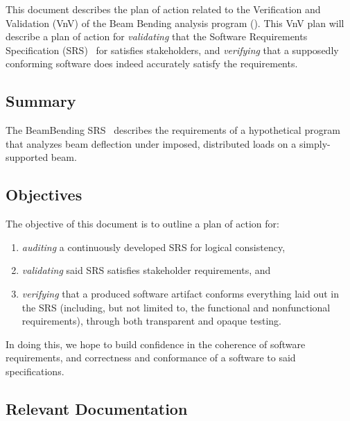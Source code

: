 \documentclass[12pt, titlepage]{article}
\begin{document}
This document describes the plan of action related to the Verification and
Validation (VnV) of the Beam Bending analysis program (\progname{}). This VnV
plan will describe a plan of action for \textit{validating} that the Software
Requirements Specification (SRS)~\cite{BalaciBeamBendingSRS2023} for \progname{}
satisfies stakeholders, and \textit{verifying} that a supposedly conforming
software does indeed accurately satisfy the requirements.

\subsection{Summary}

The BeamBending SRS~\cite{BalaciBeamBendingSRS2023} describes the requirements
of a hypothetical program that analyzes beam deflection under imposed,
distributed loads on a simply-supported beam.

\subsection{Objectives}

The objective of this document is to outline a plan of action for:

\begin{enumerate}

    \item \textit{auditing} a continuously developed SRS
          \cite{ParnasAndClements1986} for logical consistency,

    \item \textit{validating} said SRS satisfies stakeholder requirements, and

    \item \textit{verifying} that a produced software artifact conforms
          everything laid out in the SRS (including, but not limited to, the
          functional and nonfunctional requirements), through both transparent
          and opaque testing.

\end{enumerate}

In doing this, we hope to build confidence in the coherence of software
requirements, and correctness and conformance of a software to said
specifications.

\subsection{Relevant Documentation}
\end{document}
